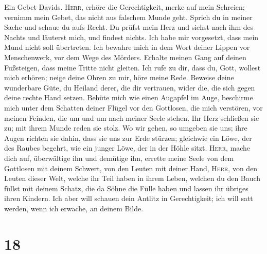  Ein Gebet Davids. \textsc{Herr}, erhöre die
Gerechtigkeit, merke auf mein Schreien; vernimm mein Gebet, das nicht
aus falschem Munde geht.  Sprich du in meiner Sache und
schaue du aufs Recht.  Du prüfst mein Herz und siehst nach
ihm des Nachts und läuterst mich, und findest nichts. Ich habe mir
vorgesetzt, dass mein Mund nicht soll übertreten.  Ich
bewahre mich in dem Wort deiner Lippen vor Menschenwerk, vor dem Wege
des Mörders.  Erhalte meinen Gang auf deinen Fußsteigen,
dass meine Tritte nicht gleiten.  Ich rufe zu dir, dass
du, Gott, wollest mich erhören; neige deine Ohren zu mir, höre meine
Rede.  Beweise deine wunderbare Güte, du Heiland derer,
die dir vertrauen, wider die, die sich gegen deine rechte Hand setzen.
 Behüte mich wie einen Augapfel im Auge, beschirme mich
unter dem Schatten deiner Flügel  vor den Gottlosen, die
mich verstören, vor meinen Feinden, die um und um nach meiner Seele
stehen.  Ihr Herz schließen sie zu; mit ihrem Munde reden
sie stolz.  Wo wir gehen, so umgeben sie uns; ihre Augen
richten sie dahin, dass sie uns zur Erde stürzen; 
gleichwie ein Löwe, der des Raubes begehrt, wie ein junger Löwe, der in
der Höhle sitzt.  \textsc{Herr}, mache dich auf,
überwältige ihn und demütige ihn, errette meine Seele von dem Gottlosen
mit deinem Schwert,  von den Leuten mit deiner Hand,
\textsc{Herr}, von den Leuten dieser Welt, welche ihr Teil haben in
ihrem Leben, welchen du den Bauch füllst mit deinem Schatz, die da Söhne
die Fülle haben und lassen ihr übriges ihren Kindern. 
Ich aber will schauen dein Antlitz in Gerechtigkeit; ich will satt
werden, wenn ich erwache, an deinem Bilde.

\hypertarget{section-17}{%
\section{18}\label{section-17}}

